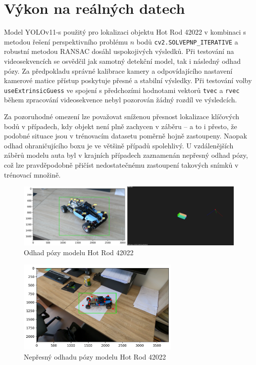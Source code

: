\section{Výkon na reálných datech}
\label{sec:Chapter52}
Model YOLOv11-s použitý pro lokalizaci objektu Hot Rod 42022 v kombinaci s metodou řešení perspektivního problému $n$ bodů \texttt{cv2.SOLVEPNP\_ITERATIVE} a robustní metodou RANSAC dosáhl uspokojivých výsledků. Při testování na videosekvencích se osvědčil jak samotný detekční model, tak i následný odhad pózy. Za předpokladu správné kalibrace kamery a odpovídajícího nastavení kamerové matice přístup poskytuje přesné a stabilní výsledky. Při testování volby \texttt{useExtrinsicGuess} ve spojení s předchozími hodnotami vektorů \texttt{tvec} a \texttt{rvec} během zpracování videosekvence nebyl pozorován žádný rozdíl ve výsledcích.

Za pozoruhodné omezení lze považovat sníženou přesnost lokalizace klíčových bodů v případech, kdy objekt není plně zachycen v záběru -- a to i přesto, že podobné situace jsou v trénovacím datasetu poměrně hojně zastoupeny. Naopak odhad ohraničujícího boxu je ve většině případů spolehlivý. U vzdálenějších záběrů modelu auta byl v krajních případech zaznamenán nepřesný odhad pózy, což lze pravděpodobně přičíst nedostatečnému zastoupení takových snímků v trénovací množině.

\begin{figure}[ht]
\centering
\includegraphics[width=1.0\textwidth,keepaspectratio]{Figures/pnp.png}
\caption[Odhad pózy modelu Hot Rod 42022]{Odhad pózy modelu Hot Rod 42022}
\label{fig:pnp}
\end{figure}

\begin{figure}[ht]
\centering
\includegraphics[width=0.7\textwidth,keepaspectratio]{Figures/nepresny.png}
\caption{Nepřesný odhadu pózy modelu Hot Rod 42022}
\label{fig:inaccurate}
\end{figure}
